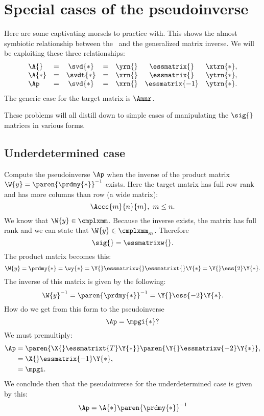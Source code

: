 \section{Special cases of the pseudoinverse}
Here are some captivating morsels to practice with. This shows the almost symbiotic relationship between the \svdl \ and the generalized matrix inverse. We will be exploiting these three relationships:
\begin{equation}
  \begin{array}{lcccccc}
     \A{}  &=& \svd{*}  &=& \yrn{} & \essmatrix{}   & \xtrn{*},\\
     \A{*} &=& \svdt{*} &=& \xrn{} & \essmatrix{}   & \ytrn{*},\\
     \Ap   &=& \svd{*}  &=& \xrn{} & \essmatrix{-1} & \ytrn{*}.
  \end{array}
\end{equation}
The generic case for the target matrix is $\Amnr$.

These problems will all distill down to simple cases of manipulating the $\sig{}$ matrices in various forms.
\subsection{Underdetermined case}
\label{sec:underdetermined}
Compute the pseudoinverse $\Ap$ when the inverse of the product matrix $\W{y} = \paren{\prdmy{*}}^{-1}$ exists. Here the target matrix has full row rank and has more columns than row (a wide matrix):
\begin{equation}
  \Accc{m}{n}{m}, \ m\le n.
\end{equation}
We know that $\W{y}\in\cmplxmm$. Because the inverse exists, the matrix has full rank and we can state that $\W{y}\in\cmplxmm_{m}$. Therefore
\begin{equation}
  \sig{} = \essmatrixw{}.
\end{equation}
The product matrix becomes this:
\begin{equation}
  \W{y} = \prdmy{*} = \wy{*} = \Y{} \essmatrixw{} \essmatrixt{} \Y{*} = \Y{}\ess{2}\Y{*}.
\end{equation}
The inverse of this matrix is given by the following:
\begin{equation}
  \W{y}^{-1} = \paren{\prdmy{*}}^{-1} = \Y{}\ess{-2}\Y{*}.
\end{equation}
How do we get from this form to the pseudoinverse
\begin{equation*}
  \Ap = \mpgi{*}?
\end{equation*}
We must premultiply:
\begin{equation}
  \begin{split}
     \Ap &= \paren{\X{}\essmatrixt{T}\Y{*}}\paren{\Y{}\essmatrixw{-2}\Y{*}} ,\\
         &= \X{}\essmatrix{-1}\Y{*},\\
         &= \mpgi.
  \end{split}
\end{equation}
We conclude then that the pseudoinverse for the underdetermined case is given by this:
\begin{equation}
  \Ap = \A{*}\paren{\prdmy{*}}^{-1}
\end{equation}

